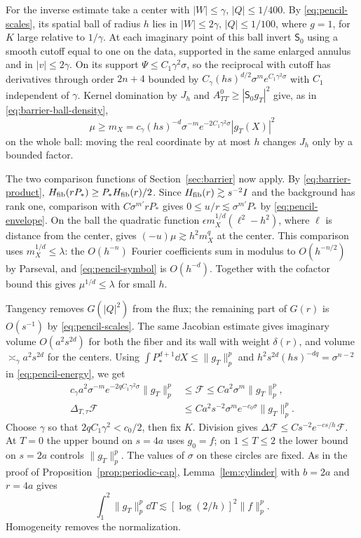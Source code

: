 For the inverse estimate take a center with $|W|\le\gamma$, $|Q|\le1/400$.
By \eqref{eq:pencil-scales}, its spatial ball of radius $h$ lies in
$|W|\le2\gamma$, $|Q|\le1/100$, where $g=1$, for $K$ large relative to
$1/\gamma$. At each imaginary point of this ball invert $\mathsf S_0$
using a smooth cutoff equal to one on the data, supported in the same
enlarged annulus and in $|v|\le2\gamma$. On its support
$\Psi\le C_1\gamma^2\sigma$, so the reciprocal with cutoff has derivatives
through order $2n+4$ bounded by
$C_\gamma(hs)^{d/2}\sigma^m e^{C_1\gamma^2\sigma}$ with $C_1$ independent
of $\gamma$. Kernel domination by $J_h$ and $A^0_{TT}\ge|\mathsf S_0g_T|^2$
give, as in \eqref{eq:barrier-ball-density},
\[
 \mu\ge m_X=c_\gamma(hs)^{-d}\sigma^{-m}e^{-2C_1\gamma^2\sigma}|g_T(X)|^2
\]
on the whole ball: moving the real coordinate by at most $h$ changes $J_h$
only by a bounded factor.

The two comparison functions of Section~\ref{sec:barrier} now apply.
By \eqref{eq:barrier-product}, $H_{\rm fib}(rP_*)\ge P_*H_{\rm fib}(r)/2$.
Since $H_{\rm fib}(r)\gtrsim s^{-2}I$ and the background has rank one,
comparison with $C\sigma^{m'}rP_*$ gives $0\le u/r\lesssim\sigma^{m'}P_*$
by \eqref{eq:pencil-envelope}. On the ball the quadratic function
$\epsilon m_X^{1/d}(\ell^2-h^2)$, where $\ell$ is distance from the center,
gives $(-u)\mu\gtrsim h^2m_X^q$ at the center. This comparison uses
$m_X^{1/d}\le\lambda$: the $O(h^{-n})$ Fourier coefficients sum in modulus
to $O(h^{-n/2})$ by Parseval, and \eqref{eq:pencil-symbol} is $O(h^{-d})$.
Together with the cofactor bound this gives $\mu^{1/d}\le\lambda$ for small $h$.

Tangency removes $G(|Q|^2)$ from the flux; the remaining part of $G(r)$
is $O(s^{-1})$ by \eqref{eq:pencil-scales}. The same Jacobian estimate
gives imaginary volume $O(a^2s^{2d})$ for both the fiber and its wall with
weight $\delta(r)$, and volume $\asymp_\gamma a^2s^{2d}$ for the centers.
Using $\int P_*^{d+1}\dd X\le\|g_T\|_p^p$ and $h^2s^{2d}(hs)^{-dq}=\sigma^{n-2}$
in \eqref{eq:pencil-energy}, we get
\begin{align}
 c_\gamma a^2\sigma^{-m}e^{-2q C_1\gamma^2\sigma}\|g_T\|_p^p
 &\le\mathcal F\le Ca^2\sigma^m\|g_T\|_p^p,\label{eq:pencil-lower}\\
 \Delta_{T,\tau}\mathcal F&\le Ca^2s^{-2}\sigma^me^{-c_0\sigma}\|g_T\|_p^p .
 \label{eq:pencil-upper-flux}
\end{align}
Choose $\gamma$ so that $2q C_1\gamma^2<c_0/2$, then fix $K$. Division gives
$\Delta\mathcal F\le Cs^{-2}e^{-cs/h}\mathcal F$. At $T=0$ the upper
bound on $s=4a$ uses $g_0=f$; on $1\le T\le2$ the lower bound on $s=2a$
controls $\|g_T\|_p^p$. The values of $\sigma$ on these circles are fixed.
As in the proof of Proposition~\ref{prop:periodic-cap},
Lemma~\ref{lem:cylinder} with $b=2a$ and $r=4a$ gives
\[
 \int_1^2\|g_T\|_p^p\dd T\lesssim[\log(2/h)]^2\|f\|_p^p .
\]
Homogeneity removes the normalization.

